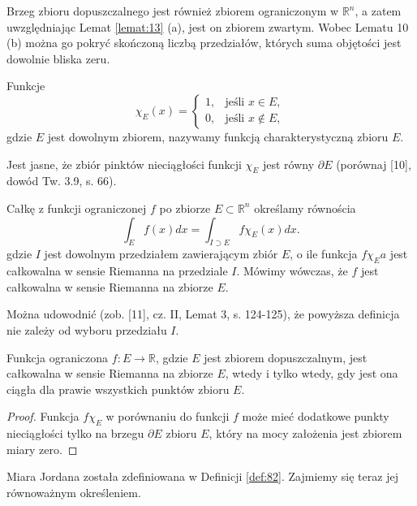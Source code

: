 \documentclass[leqno]{article}
\begin{document}
\begin{justify}
\begin{uwaga}
    Brzeg zbioru dopuszczalnego jest również zbiorem ograniczonym w $\mathbb{R}^n$, a zatem uwzględniając Lemat \ref{lemat:13} (a), jest on zbiorem zwartym.
    Wobec Lematu 10 (b) można go pokryć skończoną liczbą przedziałów, których suma objętości jest dowolnie bliska zeru.
\end{uwaga}

\begin{defn}
    Funkcje 
    \[
        \chi_E(x) = \begin{cases}
            1, &\text{jeśli } x \in E, \\
            0, &\text{jeśli } x \notin E,
        \end{cases}
    \]
    gdzie $E$ jest dowolnym zbiorem, nazywamy funkcją charakterystyczną zbioru $E$.
\end{defn}

Jest jasne, że zbiór pinktów nieciągłości funkcji $\chi_E$ jest równy $\partial E$ (porównaj [10], dowód Tw. 3.9, s. 66).

\begin{defn}
    Całkę z funkcji ograniczonej $f$ po zbiorze $E \subset \mathbb{R}^n$ określamy równościa 
    \[
        \int_{E}f(x)dx = \int_{I \supset E}f\chi_E(x)dx.
    \]
    gdzie $I$ jest dowolnym przedziałem zawierającym zbiór $E$, o ile funkcja $f\chi_Ea$ jest całkowalna w sensie Riemanna na przedziale $I$.
    Mówimy wówczas, że $f$ jest całkowalna w sensie Riemanna na zbiorze $E$. 
\end{defn}

Można udowodnić (zob. [11], cz. II, Lemat 3, s. 124-125), że powyższa definicja nie zależy od wyboru przedziału $I$.

\begin{theorem}
{
    Funkcja ograniczona $f : E \to \mathbb{R}$, gdzie $E$ jest zbiorem dopuszczalnym, jest całkowalna w sensie Riemanna na zbiorze $E$, wtedy i tylko wtedy, gdy 
    jest ona ciągła dla prawie wszystkich punktów zbioru $E$.
}
\end{theorem}

\begin{proof}
    Funkcja $f\chi_E$ w porównaniu do funkcji $f$ może mieć dodatkowe punkty nieciągłości tylko na brzegu $\partial E$ zbioru $E$, który na mocy założenia jest zbiorem miary zero.
\end{proof}

Miara Jordana została zdefiniowana w Definicji \ref{def:82}. Zajmiemy się teraz jej równoważnym określeniem.


\end{justify}
\end{document}
